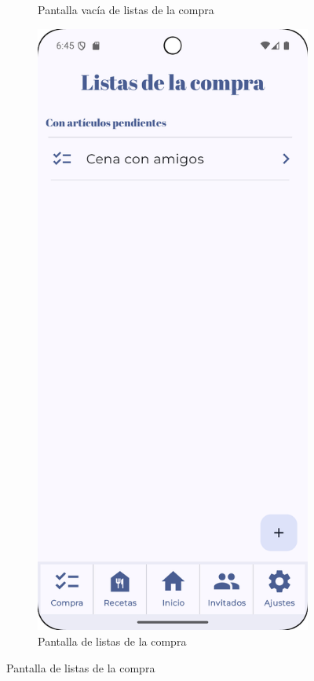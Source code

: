 \begin{figure}[H]
\begin{subfigure}[b]{0.3\textwidth}
      \caption{Pantalla vacía de listas de la compra}
      \label{fig:shopping-empty}
    \end{subfigure}
    \hfill
    \begin{subfigure}[b]{0.3\textwidth}
      \includegraphics[width=\textwidth]{./img/manual/pinche_one_shopping_list.png}
      \caption{Pantalla de listas de la compra}
      \label{fig:shopping}
    \end{subfigure}


\end{figure}
